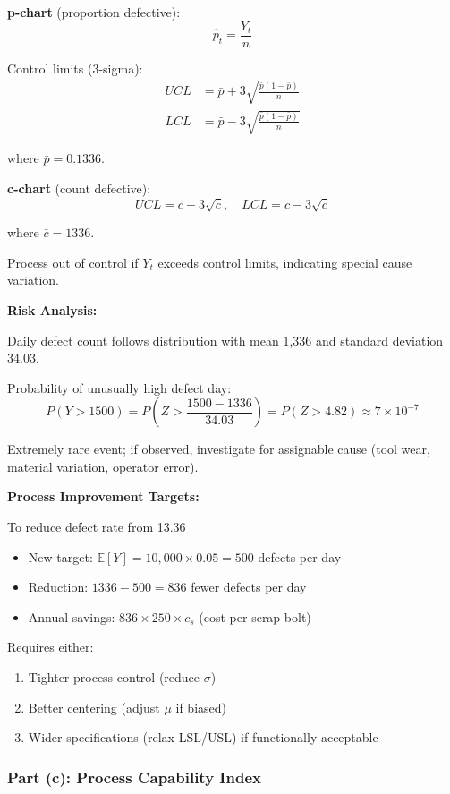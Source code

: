 \documentclass[12pt]{article}
\begin{document}
\begin{explanation}
\textbf{p-chart} (proportion defective):
\[
\hat{p}_t = \frac{Y_t}{n}
\]

Control limits (3-sigma):
\begin{align*}
UCL &= \bar{p} + 3\sqrt{\frac{\bar{p}(1-\bar{p})}{n}} \\
LCL &= \bar{p} - 3\sqrt{\frac{\bar{p}(1-\bar{p})}{n}}
\end{align*}

where $\bar{p} = 0.1336$.

\textbf{c-chart} (count defective):
\[
UCL = \bar{c} + 3\sqrt{\bar{c}}, \quad LCL = \bar{c} - 3\sqrt{\bar{c}}
\]

where $\bar{c} = 1336$.

Process out of control if $Y_t$ exceeds control limits, indicating special cause variation.

\textbf{Risk Analysis:}

Daily defect count follows distribution with mean 1,336 and standard deviation 34.03.

Probability of unusually high defect day:
\[
P(Y > 1500) = P\left(Z > \frac{1500 - 1336}{34.03}\right) = P(Z > 4.82) \approx 7 \times 10^{-7}
\]

Extremely rare event; if observed, investigate for assignable cause (tool wear, material variation, operator error).

\textbf{Process Improvement Targets:}

To reduce defect rate from 13.36%
\begin{itemize}
    \item New target: $\mathbb{E}[Y] = 10,000 \times 0.05 = 500$ defects per day
    \item Reduction: $1336 - 500 = 836$ fewer defects per day
    \item Annual savings: $836 \times 250 \times c_s$ (cost per scrap bolt)
\end{itemize}

Requires either:
\begin{enumerate}
    \item Tighter process control (reduce $\sigma$)
    \item Better centering (adjust $\mu$ if biased)
    \item Wider specifications (relax LSL/USL) if functionally acceptable
\end{enumerate}

\end{explanation}

\subsubsection{Part (c): Process Capability Index}
\end{document}
